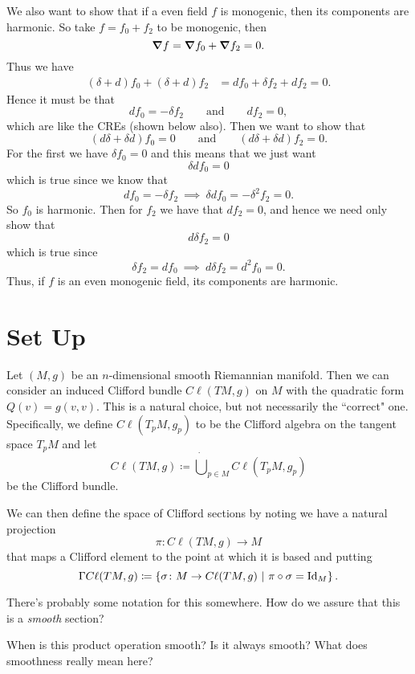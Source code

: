 We also want to show that if a even field $f$ is monogenic, then its components are harmonic. So take $f=f_0+f_2$ to be monogenic, then
\[
\boldsymbol{\nabla} f = \boldsymbol{\nabla} f_0 + \boldsymbol{\nabla} f_2 = 0.
\]
Thus we have
\begin{align*}
    (\delta + d)f_0 + (\delta+d)f_2&= df_0 + \delta f_2 + df_2 = 0. 
\end{align*}
Hence it must be that 
\[
df_0 = - \delta f_2 \qquad \textrm{and} \qquad df_2 = 0,
\]
which are like the CREs (shown below also).  Then we want to show that
\[
(d\delta +\delta d)f_0 = 0 \qquad \textrm{and} \qquad (d\delta + \delta d) f_2 = 0.
\]
For the first we have $\delta f_0=0$ and this means that we just want
\[
\delta d f_0 =0 
\]
which is true since we know that 
\[
df_0 = -\delta f_2 ~\implies~ \delta df_0 = -\delta^2 f_2 = 0.
\]
So $f_0$ is harmonic.  Then for $f_2$ we have that $df_2=0$, and hence we need only show that
\[
d\delta f_2 =0
\]
which is true since
\[
\delta f_2 = df_0 ~\implies~ d\delta f_2 = d^2 f_0 = 0.
\]
Thus, if $f$ is an even monogenic field, its components are harmonic.



\section*{Set Up}
Let $(M,g)$ be an $n$-dimensional smooth Riemannian manifold.  Then we can consider an induced Clifford bundle $C\ell(TM,g)$ on $M$ with the quadratic form $Q(v)=g(v,v)$.  This is a natural choice, but not necessarily the ``correct" one.  Specifically, we define $C\ell(T_pM,g_p)$ to be the Clifford algebra on the tangent space $T_pM$ and let
\[
C\ell(TM,g) \coloneqq \dot{\bigcup}_{p\in M} C\ell (T_pM,g_p)
\]
be the Clifford bundle.

We can then define the space of Clifford sections by noting we have a natural projection
\[
\pi \colon C\ell(TM,g) \to M
\]
that maps a Clifford element to the point at which it is based and putting
\[
\Gamma C \ell (TM,g) \coloneqq \left\{ \sigma \colon M \to C\ell(TM,g) ~\vert~ \pi \circ \sigma = \mathrm{Id}_M\right\}.
\]
\begin{question}
There's probably some notation for this somewhere. How do we assure that this is a \emph{smooth} section?
\end{question}

\begin{question}
When is this product operation smooth? Is it always smooth? What does smoothness really mean here?
\end{question}

